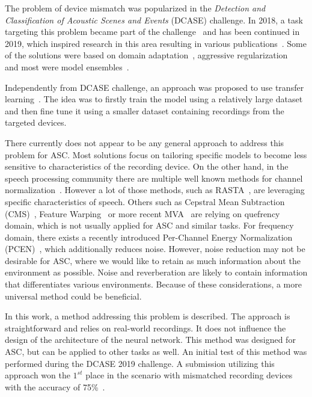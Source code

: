 \documentclass[a4paper]{article}
\begin{document}
The problem of device mismatch was popularized in the \textit{Detection and Classification of Acoustic Scenes and Events} (DCASE) challenge. In 2018, a task targeting this problem became part of the challenge~\cite{dcase} and has been continued in 2019, which inspired research in this area resulting in various publications~\cite{truc,da-asc,nguyenAcousticSceneClassification2020}. Some of the solutions were based on domain adaptation~\cite{dcase-Eghbal-zadeh2019}, aggressive regularization~\cite{dcase-Eghbal-zadeh2019,dcase-Gao2019} and most were model ensembles~\cite{dcase-Nguyen2018}. 

Independently from DCASE challenge, an approach was proposed to use transfer learning~\cite{transfer-wireless}. The idea was to firstly train the model using a relatively large dataset and then fine tune it using a smaller dataset containing recordings from the targeted devices.

There currently does not appear to be any general approach to address this problem for ASC. Most solutions focus on tailoring specific models to become less sensitive to characteristics of the recording device. On the other hand, in the speech processing community there are multiple well known methods for channel normalization~\cite{junquaRobustnessLanguageSpeech2001, sternSignalProcessingRobust1996, burgetAnalysisFeatureExtraction2007}. However a lot of those methods, such as RASTA~\cite{hermanskyRASTAProcessingSpeech1994}, are leveraging specific characteristics of speech. Others such as Cepstral Mean Subtraction (CMS)~\cite{atalEffectivenessLinearPrediction1974a}, Feature Warping~\cite{pelecanosFeatureWarpingRobust2001} or more recent MVA~\cite{chenMVAProcessingSpeech2007} are relying on quefrency domain, which is not usually applied for ASC and similar tasks. For frequency domain, there exists a recently introduced Per-Channel Energy Normalization (PCEN)~\cite{wangTrainableFrontendRobust2017,lostanlenPerChannelEnergyNormalization2019a}, which additionally reduces noise.
However, noise reduction may not be desirable for ASC, where we would like to retain as much information about the environment as possible. Noise and reverberation are likely to contain information that differentiates various environments.
Because of these considerations, a more universal method could be beneficial.

In this work, a method addressing this problem is described. The approach is straightforward and relies on real-world recordings. It does not influence the design of the architecture of the neural network. This method was designed for ASC, but can be applied to other tasks as well. An initial test of this method was performed during the DCASE 2019 challenge. A submission utilizing this approach won the $1^{st}$ place in the scenario with mismatched recording devices with the accuracy of 75\%~\cite{Komider2019}.
\end{document}
